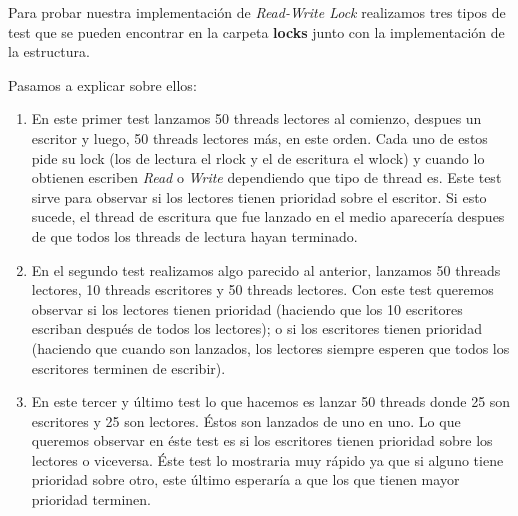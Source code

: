 Para probar nuestra implementación de \textit{Read-Write Lock} realizamos tres tipos de test que se pueden encontrar en la carpeta \textbf{locks} junto con la implementación de la estructura.

Pasamos a explicar sobre ellos:

\begin{enumerate}
	\item En este primer test lanzamos 50 threads lectores al comienzo, despues un escritor y luego, 50 threads lectores más, en este orden. Cada uno de estos pide su lock (los de lectura el rlock y el de escritura el wlock) y cuando lo obtienen escriben \emph{Read} o \emph{Write} dependiendo que tipo de thread es. 
	Este test sirve para observar si los lectores tienen prioridad sobre el escritor. Si esto sucede, el thread de escritura que fue lanzado en el medio aparecería despues de que todos los threads de lectura hayan terminado.

	\item En el segundo test realizamos algo parecido al anterior, lanzamos 50 threads lectores, 10 threads escritores y 50 threads lectores.
	Con este test queremos observar si los lectores tienen prioridad (haciendo que los 10 escritores escriban después de todos los lectores); o si los escritores tienen prioridad (haciendo que cuando son lanzados, los lectores siempre esperen que todos los escritores terminen de escribir).

	\item En este tercer y último test lo que hacemos es lanzar 50 threads donde 25 son escritores y 25 son lectores. Éstos son lanzados de uno en uno. 
	Lo que queremos observar en éste test es si los escritores tienen prioridad sobre los lectores o viceversa. Éste test lo mostraria muy rápido ya que si alguno tiene prioridad sobre otro, este último esperaría a que los que tienen mayor prioridad terminen.
\end{enumerate}